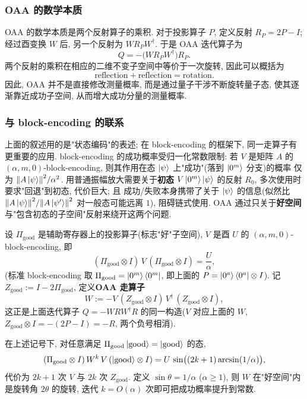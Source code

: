 \documentclass[utf8]{article} %
\numberwithin{equation}{section}   %
\newtheorem{Def}{\hskip 2em {\color{green} 定义}}[subsection]
\newtheorem{Thm}{\hskip 2em {\color{blue} 定理}}[subsection]
\begin{document}
\subsubsection{OAA 的数学本质}

OAA 的数学本质是两个反射算子的乘积. 对于投影算子 $P$, 定义反射 $R_P = 2P - I$;
经过酉变换 $W$ 后, 另一个反射为 $WR_PW^\dagger$. 于是 OAA 迭代算子为
\[
    Q = -\big(WR_PW^\dagger\big)R_P.
\]
两个反射的乘积在相应的二维不变子空间中等价于一次旋转, 因此可以概括为
\[
    \boxed{\text{reflection} + \text{reflection} = \text{rotation}}.
\]
因此, OAA 并不是直接修改测量概率, 而是通过量子干涉不断旋转量子态, 
使其逐渐靠近成功子空间, 从而增大成功分量的测量概率.

\subsubsection{与 block-encoding 的联系}

上面的叙述用的是"状态编码"的表述; 在 block-encoding 的框架下, 同一走算子有更重要的应用.
block-encoding 的成功概率受归一化常数限制: 若 $V$ 是矩阵 $A$ 的
$(\alpha, m, 0)$-block-encoding, 则其作用在态 $\ket{\psi}$ 上"成功"(落到 $\ket{0^m}$ 分支)的概率
仅为 $\norm{A\ket{\psi}}^2/\alpha^2$. 用普通振幅放大需要关于\textbf{初态}
$V\ket{0^m}\ket{\psi}$ 的反射 $R_0$, 多次使用时要求"回退"到初态, 代价巨大; 且
成功/失败本身携带了关于 $\ket{\psi}$ 的信息(似然比
$\norm{A\ket{\psi}}^2/\norm{A\ket{\psi'}}^2$ 对一般态可能远离 $1$), 阻碍链式使用.
OAA 通过只关于\textbf{好空间}与"包含初态的子空间"反射来绕开这两个问题.

\begin{Def}
    设 $\Pi_{\mathrm{good}}$ 是辅助寄存器上的投影算子(标志"好"子空间),
    $V$ 是酉 $U$ 的 $(\alpha, m, 0)$-block-encoding, 即
    \[ (\Pi_{\mathrm{good}}\otimes I)\, V\, (\Pi_{\mathrm{good}}\otimes I) = \frac{U}{\alpha}, \]
    (标准 block-encoding 取 $\Pi_{\mathrm{good}} = \ket{0^m}\bra{0^m}$, 即上面的
    $P = \ket{0^a}\bra{0^a}\otimes I$). 记 $Z_{\mathrm{good}} := I - 2\Pi_{\mathrm{good}}$,
    定义\textbf{OAA 走算子}
    \begin{equation}
        W := -V\,(Z_{\mathrm{good}}\otimes I)\, V^\dagger\,(Z_{\mathrm{good}}\otimes I),
    \end{equation}
    这正是上面迭代算子 $Q = -WRW^\dagger R$ 的同一构造($V$ 对应上面的 $W$,
    $Z_{\mathrm{good}}\otimes I = -(2P - I) = -R$, 两个负号相消).
\end{Def}

\begin{Thm}[非感知振幅放大]
    在上述记号下, 对任意满足 $\Pi_{\mathrm{good}}\ket{\mathrm{good}} = \ket{\mathrm{good}}$
    的态,
    \begin{equation}
        (\Pi_{\mathrm{good}}\otimes I)\, W^k\, V\,(\ket{\mathrm{good}}\otimes I)
        = U\,\sin\!\big((2k+1)\arcsin(1/\alpha)\big),
    \end{equation}
    代价为 $2k+1$ 次 $V$ 与 $2k$ 次 $Z_{\mathrm{good}}$. 定义 $\sin\theta = 1/\alpha$
    ($\alpha \ge 1$), 则 $W$ 在"好空间"内是旋转角 $2\theta$ 的旋转, 迭代
    $k = O(\alpha)$ 次即可把成功概率提升到常数.
\end{Thm}
\end{document}
